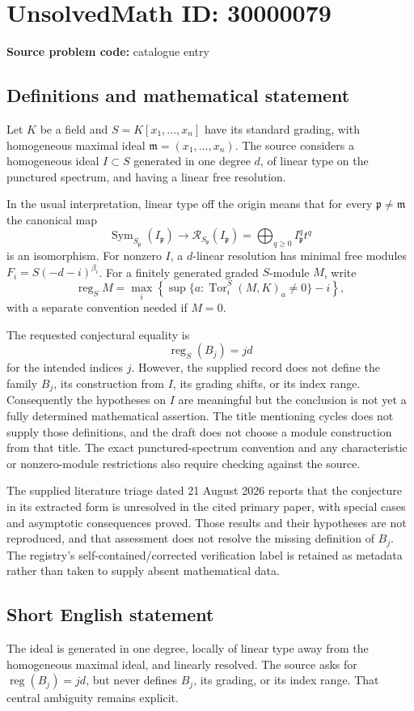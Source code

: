 \documentclass[11pt]{article}
\begin{document}
\section*{UnsolvedMath ID: 30000079}
\textbf{Source problem code:} catalogue entry
\subsection{Definitions and mathematical statement}
Let \(K\) be a field and \(S=K[x_1,\ldots,x_n]\) have its standard grading, with homogeneous maximal ideal \(\mathfrak m=(x_1,\ldots,x_n)\). The source considers a homogeneous ideal \(I\subset S\) generated in one degree \(d\), of linear type on the punctured spectrum, and having a linear free resolution.

In the usual interpretation, linear type off the origin means that for every \(\mathfrak p\ne\mathfrak m\) the canonical map
\[
 \operatorname{Sym}_{S_{\mathfrak p}}(I_{\mathfrak p})
 \longrightarrow\mathcal R_{S_{\mathfrak p}}(I_{\mathfrak p})
 =\bigoplus_{q\geq0}I_{\mathfrak p}^{q}t^q
\]
is an isomorphism. For nonzero \(I\), a \(d\)-linear resolution has minimal free modules \(F_i=S(-d-i)^{\beta_i}\). For a finitely generated graded \(S\)-module \(M\), write
\[
 \operatorname{reg}_S M=\max_i\left\{\sup\{a:\operatorname{Tor}_i^S(M,K)_a\ne0\}-i\right\},
\]
with a separate convention needed if \(M=0\).

The requested conjectural equality is
\[
 \operatorname{reg}_S(B_j)=jd
\]
for the intended indices \(j\). However, the supplied record does not define the family \(B_j\), its construction from \(I\), its grading shifts, or its index range. Consequently the hypotheses on \(I\) are meaningful but the conclusion is not yet a fully determined mathematical assertion. The title mentioning cycles does not supply those definitions, and the draft does not choose a module construction from that title. The exact punctured-spectrum convention and any characteristic or nonzero-module restrictions also require checking against the source.

The supplied literature triage dated 21 August 2026 reports that the conjecture in its extracted form is unresolved in the cited primary paper, with special cases and asymptotic consequences proved. Those results and their hypotheses are not reproduced, and that assessment does not resolve the missing definition of \(B_j\). The registry's self-contained/corrected verification label is retained as metadata rather than taken to supply absent mathematical data.
\subsection{Short English statement}
The ideal is generated in one degree, locally of linear type away from the homogeneous maximal ideal, and linearly resolved. The source asks for \(\operatorname{reg}(B_j)=jd\), but never defines \(B_j\), its grading, or its index range. That central ambiguity remains explicit.
\end{document}
